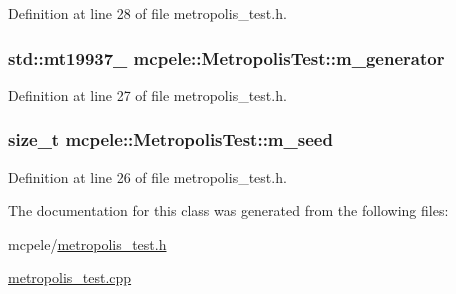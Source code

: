 \-Definition at line 28 of file metropolis\-\_\-test.\-h.

\hypertarget{classmcpele_1_1MetropolisTest_acf16d24f5b32afb1977c542e20dc23cf}{
\subsubsection[{m\-\_\-generator}]{\setlength{\rightskip}{0pt plus 5cm}std\-::mt19937\-\_ {\bf mcpele\-::\-Metropolis\-Test\-::m\-\_\-generator}}}\label{classmcpele_1_1MetropolisTest_acf16d24f5b32afb1977c542e20dc23cf}


\-Definition at line 27 of file metropolis\-\_\-test.\-h.

\hypertarget{classmcpele_1_1MetropolisTest_aa2973163ef6d8160e5f1d096cc7d4170}{
\subsubsection[{m\-\_\-seed}]{\setlength{\rightskip}{0pt plus 5cm}size\-\_\-t {\bf mcpele\-::\-Metropolis\-Test\-::m\-\_\-seed}}}\label{classmcpele_1_1MetropolisTest_aa2973163ef6d8160e5f1d096cc7d4170}


\-Definition at line 26 of file metropolis\-\_\-test.\-h.



\-The documentation for this class was generated from the following files\-:\begin{DoxyCompactItemize}
\item 
mcpele/\hyperlink{metropolis__test_8h}{metropolis\-\_\-test.\-h}\item 
\hyperlink{metropolis__test_8cpp}{metropolis\-\_\-test.\-cpp}\end{DoxyCompactItemize}
